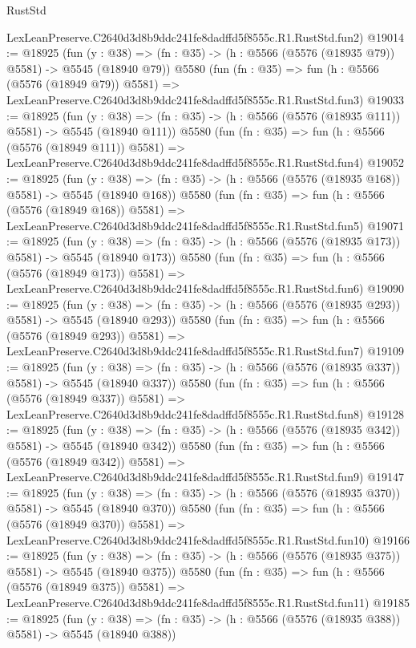 \begin{lexlean}{RustStd}
\begin{coremodule}
    LexLeanPreserve.C2640d3d8b9ddc241fe8dadffd5f8555c.R1.RustStd.fun2)
@19014 := @18925
    (fun (y : @38) => (fn : @35) -> (h : @5566 (@5576 (@18935 @79)) @5581) -> @5545 (@18940 @79))
    @5580
    (fun (fn : @35) =>
    fun (h : @5566 (@5576 (@18949 @79)) @5581) =>
    LexLeanPreserve.C2640d3d8b9ddc241fe8dadffd5f8555c.R1.RustStd.fun3)
@19033 := @18925
    (fun (y : @38) => (fn : @35) -> (h : @5566 (@5576 (@18935 @111)) @5581) -> @5545 (@18940 @111))
    @5580
    (fun (fn : @35) =>
    fun (h : @5566 (@5576 (@18949 @111)) @5581) =>
    LexLeanPreserve.C2640d3d8b9ddc241fe8dadffd5f8555c.R1.RustStd.fun4)
@19052 := @18925
    (fun (y : @38) => (fn : @35) -> (h : @5566 (@5576 (@18935 @168)) @5581) -> @5545 (@18940 @168))
    @5580
    (fun (fn : @35) =>
    fun (h : @5566 (@5576 (@18949 @168)) @5581) =>
    LexLeanPreserve.C2640d3d8b9ddc241fe8dadffd5f8555c.R1.RustStd.fun5)
@19071 := @18925
    (fun (y : @38) => (fn : @35) -> (h : @5566 (@5576 (@18935 @173)) @5581) -> @5545 (@18940 @173))
    @5580
    (fun (fn : @35) =>
    fun (h : @5566 (@5576 (@18949 @173)) @5581) =>
    LexLeanPreserve.C2640d3d8b9ddc241fe8dadffd5f8555c.R1.RustStd.fun6)
@19090 := @18925
    (fun (y : @38) => (fn : @35) -> (h : @5566 (@5576 (@18935 @293)) @5581) -> @5545 (@18940 @293))
    @5580
    (fun (fn : @35) =>
    fun (h : @5566 (@5576 (@18949 @293)) @5581) =>
    LexLeanPreserve.C2640d3d8b9ddc241fe8dadffd5f8555c.R1.RustStd.fun7)
@19109 := @18925
    (fun (y : @38) => (fn : @35) -> (h : @5566 (@5576 (@18935 @337)) @5581) -> @5545 (@18940 @337))
    @5580
    (fun (fn : @35) =>
    fun (h : @5566 (@5576 (@18949 @337)) @5581) =>
    LexLeanPreserve.C2640d3d8b9ddc241fe8dadffd5f8555c.R1.RustStd.fun8)
@19128 := @18925
    (fun (y : @38) => (fn : @35) -> (h : @5566 (@5576 (@18935 @342)) @5581) -> @5545 (@18940 @342))
    @5580
    (fun (fn : @35) =>
    fun (h : @5566 (@5576 (@18949 @342)) @5581) =>
    LexLeanPreserve.C2640d3d8b9ddc241fe8dadffd5f8555c.R1.RustStd.fun9)
@19147 := @18925
    (fun (y : @38) => (fn : @35) -> (h : @5566 (@5576 (@18935 @370)) @5581) -> @5545 (@18940 @370))
    @5580
    (fun (fn : @35) =>
    fun (h : @5566 (@5576 (@18949 @370)) @5581) =>
    LexLeanPreserve.C2640d3d8b9ddc241fe8dadffd5f8555c.R1.RustStd.fun10)
@19166 := @18925
    (fun (y : @38) => (fn : @35) -> (h : @5566 (@5576 (@18935 @375)) @5581) -> @5545 (@18940 @375))
    @5580
    (fun (fn : @35) =>
    fun (h : @5566 (@5576 (@18949 @375)) @5581) =>
    LexLeanPreserve.C2640d3d8b9ddc241fe8dadffd5f8555c.R1.RustStd.fun11)
@19185 := @18925
    (fun (y : @38) => (fn : @35) -> (h : @5566 (@5576 (@18935 @388)) @5581) -> @5545 (@18940 @388))

\end{coremodule}
\end{lexlean}
